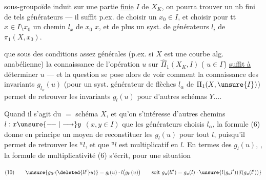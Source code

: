 
sous-groupoïde induit sur une partie \uline{finie}  $I$ de $X_K$, on pourra trouver un nb fini de tels générateurs --- il suffit p.ex. de choisir un  $x_0\in I$, et choisir pour tt $x\in I\setminus x_0$ un chemin $l_x$ de $x_0$  $x$, et de plus un syst.  de générateurs $l_i$ de $\pi_1(X,x_0)$.

 que sous des conditions assez générales (p.ex. si $X$ est une courbe alg. anabélienne) la connaissance de l'opération $u$ sur $\widehat{\Pi}_1(X_K,I)$ ( $u\in\Gamma$) \uline{suffit à} déterminer $u$ --- et la question se pose alors de voir comment la connaissance des invariants $g_{l_\alpha}(u)$  (pour un syst. générateur de flèches $l_\alpha$ de $\Pi_1(X,\unsure{I})$) permet de retrouver les invariants $g_l(u)$ pour d'autres schémas $Y\ldots$.


Quand il s'agit du $=$ schéma $X$, et qu'on s'intéresse  d'autres chemins $l:x\unsure{\relbar\joinrel\relbar|\longrightarrow}y$ $(x,y\in I)$ que les générateurs choisis $l_\alpha$, la formule (6) donne en principe un moyen de reconstituer les $g_l(u)$ pour tout $l$, puisqu'il permet de retrouver les ${}^u l$, et que ${}^u l$ est multiplicatif en $l$. En termes des $g_l(u)$, , la formule de multiplicativité (6) s'écrit, pour une situation



\[
(10)\qquad \unsure{g_{ll'}(\deleted{ll'}u)}=g_l(u)\cdot l\bigl(g_{l'}(u)\bigr)
\qquad\text{soit }g_u(ll')=g_u(l)\cdot \unsure{l(g_u l'))|l(g_u(l'))}
\]

